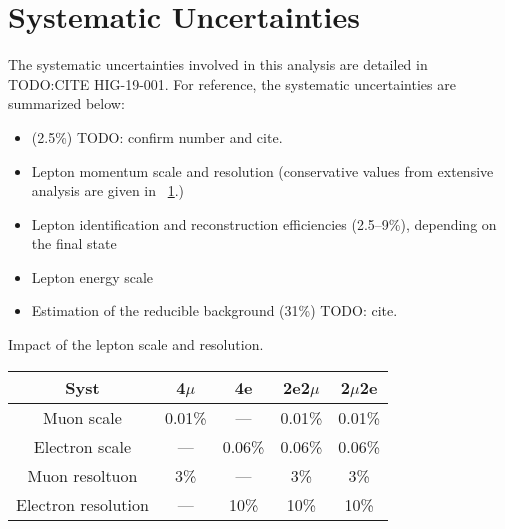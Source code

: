 \section{Systematic Uncertainties}
\label{sec:syst_uncert}
The systematic uncertainties involved in this analysis are detailed in TODO:CITE HIG-19-001.
For reference, the systematic uncertainties are summarized below:
\begin{itemize}
	\item \lumiint (2.5\%) TODO: confirm number and cite.
	\item Lepton momentum scale and resolution (conservative values from extensive analysis are given in \tablename~\ref{table:ScaleRes_syst}.)
	\item Lepton identification and reconstruction efficiencies (2.5--9\%), depending on the final state %
	\item Lepton energy scale
	\item Estimation of the reducible background (31\%) TODO: cite.
\end{itemize}
\begin{table}[ht]
	\begin{center}
		\topcaption
		{Impact of the lepton scale and resolution.}
                \begin{tabular}{ccccc}
		\hline
		Syst	&	4$\mu$	&	4e	&	2e2$\mu$	&	2$\mu$2e	\\
		\hline
		Muon scale	&	0.01\%	&	---	&	0.01\%	&	0.01\%	\\
		Electron scale	&	---	&	0.06\%	&	0.06\%	&	0.06\%	\\
		\hline
		Muon resoltuon	&	3\%	&	---	&	3\%	&	3\%	\\
		Electron resolution	&	---	&	10\%	&       10\%&       10\%	\\
		\hline
		\end{tabular}
		\label{table:ScaleRes_syst}
	\end{center}
\end{table}

